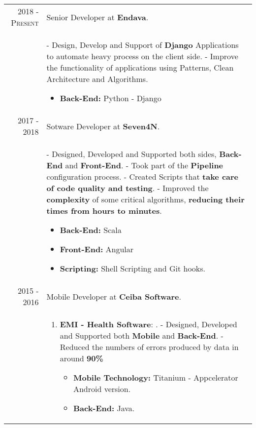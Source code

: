 \documentclass[a4paper,11pt]{article} %
\begin{document}
\begin{tabular}{r|p{12cm}}
\textsc{2018 - Present} & Senior Developer at \textbf{Endava}.\\
\newline
& \footnotesize{
- Design, Develop and Support of \textbf{Django} Applications to automate heavy process on the client side.\newline
- Improve the functionality of applications using Patterns, Clean Architecture and Algorithms. 
\begin{itemize}
\item \textbf{Back-End:} Python - Django
\end{itemize}}\\

\textsc{2017 - 2018} & Sotware Developer at \textbf{Seven4N}.\\
& \footnotesize{
- Designed, Developed and Supported both sides, \textbf{Back-End} and \textbf{Front-End}. \newline
- Took part of the \textbf{Pipeline} configuration process.\newline
- Created Scripts that \textbf{take care of code quality and testing}. \newline
- Improved the \textbf{complexity} of some critical algorithms, \textbf{reducing their times from hours to minutes}. 
\begin{itemize}
\item \textbf{Back-End:} Scala
\item \textbf{Front-End:} Angular
\item \textbf{Scripting:} Shell Scripting and Git hooks.
\end{itemize}}\\
\textsc{2015 - 2016} & Mobile Developer at \textbf{Ceiba Software}.\\
& \footnotesize{
\begin{enumerate}
\item \textbf{EMI - Health Software}: .\newline
- Designed, Developed and Supported both \textbf{Mobile} and \textbf{Back-End}.\newline
- Reduced the numbers of errors produced by data in around \textbf{90\%}
\begin{itemize}
\item \textbf{Mobile Technology:} Titanium - Appcelerator Android version.
\item \textbf{Back-End:} Java.
\end{itemize}

\end{enumerate}}
\end{tabular}
\end{document}
